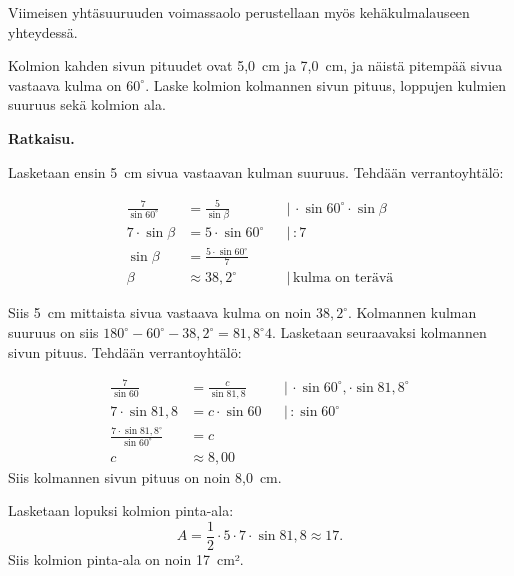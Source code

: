 Viimeisen yhtäsuuruuden voimassaolo perustellaan myös kehäkulmalauseen yhteydessä.


\begin{esimerkki}
Kolmion kahden sivun pituudet ovat 5,0~cm ja 7,0~cm, ja näistä pitempää sivua vastaava kulma on $60^\circ$. Laske kolmion kolmannen sivun pituus, loppujen kulmien suuruus sekä kolmion ala.



\textbf{Ratkaisu.}

Lasketaan ensin 5~cm sivua vastaavan kulman suuruus. Tehdään verrantoyhtälö:

\begin{align*}
\frac{7}{\sin 60^\circ}  &= \frac{5}{\sin \beta} & & | \, \cdot \sin 60^\circ \cdot \sin \beta\\
7 \cdot \sin \beta &= 5 \cdot \sin 60^\circ  & & | \,  :7\\
\sin \beta         &= \frac{5 \cdot \sin 60^\circ}{7}\\
\beta              &\approx 38,2^\circ & & | \, \text{kulma on terävä}
\end{align*}

Siis 5~cm mittaista sivua vastaava kulma on noin $38,2^\circ$. Kolmannen kulman suuruus on siis $180^\circ - 60^\circ -38,2^\circ = 81,8^\circ4$.
Lasketaan seuraavaksi kolmannen sivun pituus. Tehdään verrantoyhtälö:

\begin{align*}
\frac{7}{\sin 60}                 &= \frac{c}{\sin 81,8} & & | \,  \cdot \sin 60^\circ, \cdot \sin 81,8^\circ \\
7 \cdot \sin 81,8                 &= c \cdot \sin 60     & & | \,  : \sin 60^\circ \\
\frac{7 \cdot \sin 81,8^\circ}{\sin 60^\circ} &= c \\
c                                 &\approx 8,00
\end{align*}
Siis kolmannen sivun pituus on noin 8,0~cm.


Lasketaan lopuksi kolmion pinta-ala:
$$A = \frac{1}{2} \cdot 5 \cdot 7 \cdot \sin 81,8 \approx 17.$$
Siis kolmion pinta-ala on noin 17~cm².
\end{esimerkki}


